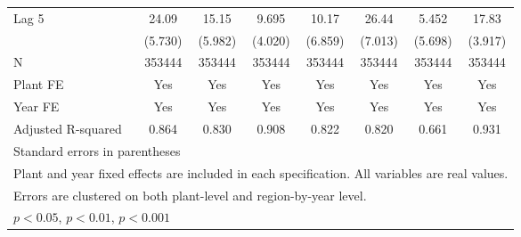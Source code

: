 \begin{table}[htbp]
\begin{tabular}{l*{7}{c}}
\addlinespace
Lag 5           &    24.09\sym{***}&    15.15\sym{*}  &    9.695\sym{*}  &    10.17         &    26.44\sym{***}&    5.452         &    17.83\sym{***}\\
                &  (5.730)         &  (5.982)         &  (4.020)         &  (6.859)         &  (7.013)         &  (5.698)         &  (3.917)         \\
\midrule
N               &   353444         &   353444         &   353444         &   353444         &   353444         &   353444         &   353444         \\
Plant FE        &      Yes         &      Yes         &      Yes         &      Yes         &      Yes         &      Yes         &      Yes         \\
Year FE         &      Yes         &      Yes         &      Yes         &      Yes         &      Yes         &      Yes         &      Yes         \\
Adjusted R-squared&    0.864         &    0.830         &    0.908         &    0.822         &    0.820         &    0.661         &    0.931         \\
\bottomrule
\multicolumn{8}{l}{\footnotesize Standard errors in parentheses}\\
\multicolumn{8}{l}{\footnotesize Plant and year fixed effects are included in each specification. All variables are real values.}\\
\multicolumn{8}{l}{\footnotesize Errors are clustered on both plant-level and region-by-year level.}\\
\multicolumn{8}{l}{\footnotesize \sym{*} \(p<0.05\), \sym{**} \(p<0.01\), \sym{***} \(p<0.001\)}\\
\end{tabular}
\end{table}
